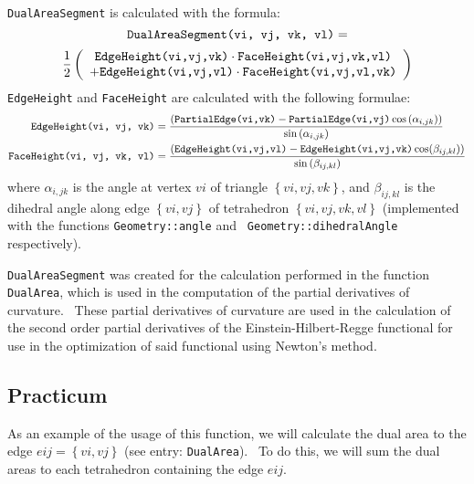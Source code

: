 \texttt{DualAreaSegment} is calculated with the formula:%
\begin{equation*}
\text{\texttt{DualAreaSegment(vi, vj, vk, vl)}}=
\end{equation*}%
\begin{equation*}
\frac{1}{2}\left( 
\begin{array}{c}
\text{\texttt{EdgeHeight(vi,vj,vk)}}\cdot \text{\texttt{%
FaceHeight(vi,vj,vk,vl)}} \\ 
+\text{\texttt{EdgeHeight(vi,vj,vl)}}\cdot \text{\texttt{%
FaceHeight(vi,vj,vl,vk)}}%
\end{array}%
\right) 
\end{equation*}%
\texttt{EdgeHeight} and \texttt{FaceHeight} are calculated with the
following formulae:%
\begin{align*}
\text{\texttt{EdgeHeight(vi, vj, vk)}}& =\frac{\left( \text{\texttt{%
PartialEdge(vi,vk)}}-\text{\texttt{PartialEdge(vi,vj)}}\cos \left( \alpha
_{i,jk}\right) \right) }{\sin \left( \alpha _{i,jk}\right) } \\
\text{\texttt{FaceHeight(vi, vj, vk, vl)}}& =\frac{\left( \text{\texttt{%
EdgeHeight(vi,vj,vl)}}-\text{\texttt{EdgeHeight(vi,vj,vk)}}\cos (\beta
_{ij,kl})\right) }{\sin \left( \beta _{ij,kl}\right) }
\end{align*}%
where $\alpha _{i,jk}$ is the angle at vertex $vi$ of triangle $\left\{
vi,vj,vk\right\} $, and $\beta _{ij,kl}$ is the dihedral angle along edge $%
\left\{ vi,vj\right\} $ of tetrahedron $\left\{ vi,vj,vk,vl\right\} $
(implemented with the functions \texttt{Geometry::angle} and \texttt{%
Geometry::dihedralAngle} respectively).

\texttt{DualAreaSegment} was created for the calculation performed in the
function \texttt{DualArea}, which is used in the computation of the partial
derivatives of curvature. \ These partial derivatives of curvature are used
in the calculation of the second order partial derivatives of the
Einstein-Hilbert-Regge functional for use in the optimization of said
functional using Newton's method. \ 

\subsection*{Practicum}

As an example of the usage of this function, we will calculate the dual area
to the edge $eij=\left\{ vi,vj\right\} $ (see entry: \texttt{DualArea}). \
To do this, we will sum the dual areas to each tetrahedron containing the
edge $eij$. \ 


